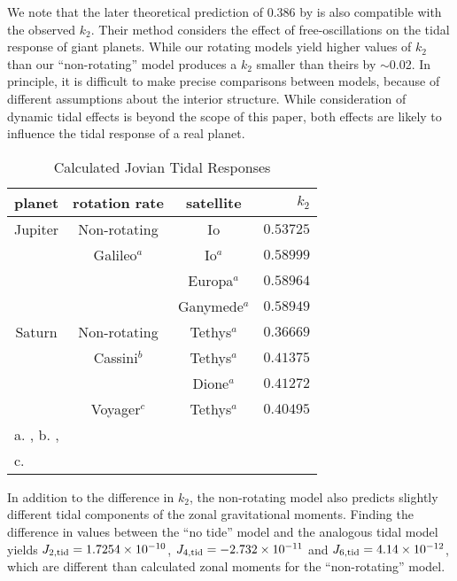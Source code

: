 We note that the later theoretical prediction of 0.386 by \citet{vorontsov1984} is
also compatible with the observed $k_2$. Their method considers the effect of
free-oscillations on the tidal response of giant planets. While our rotating models
yield higher values of $k_2$ than \citet{vorontsov1984} our ``non-rotating'' model
produces a $k_2$ smaller than theirs by $\sim$0.02. In principle, it is difficult to
make precise comparisons between models, because of different assumptions about the
interior structure. While consideration of dynamic tidal effects is beyond the scope
of this paper, both effects are likely to influence the tidal response of a real
planet.

%
\begin{table}
    \centering
\caption{Calculated Jovian Tidal Responses\label{tab:combined_table}}
\begin{tabular}{ccc|r}
    \hline
    {planet} & rotation rate & satellite  & $k_2$\\
    \hline
{Jupiter}  &  {Non-rotating}              &  {Io}
&  $0.53725$  \\
\hline
{}         &  {Galileo$^{a}$}  &
{Io$^{a}$}        &  $0.58999$  \\
{}         &  {}                          &
{Europa$^{a}$}    &  $0.58964$  \\
{}         &  {}                          &
{Ganymede$^{a}$}  &  $0.58949$  \\
\hline
{Saturn}   &  {Non-rotating}              &  {Tethys$^{a}$}    &  $0.36669$  \\
\hline
{}         &  {Cassini$^{b}$}  &
{Tethys$^{a}$}    &  $0.41375$  \\
{}         &  {}                          &
{Dione$^{a}$}     &  $0.41272$  \\
\hline
{}         &  {Voyager$^{c}$}  &
{Tethys$^{a}$}    &  $0.40495$  \\
\hline
\multicolumn{4}{l}{ a. \citet{archinal2011}, b. \citet{giampieri2006},} \\
\multicolumn{4}{l}{c. \citet{desch1981}}
\end{tabular}
\end{table}

In addition to the difference in $k_2$, the non-rotating model also predicts slightly
different tidal components of the zonal gravitational moments. Finding the difference
in values between the ``no tide'' model and the analogous tidal model yields
$J_{2,{\rm tid}}=1.7254\times10^{-10}$, $J_{4,{\rm tid}}=-2.732\times10^{-11}$ and
$J_{6,{\rm tid}}=4.14\times10^{-12}$, which are different than calculated zonal
moments for the ``non-rotating'' model.


